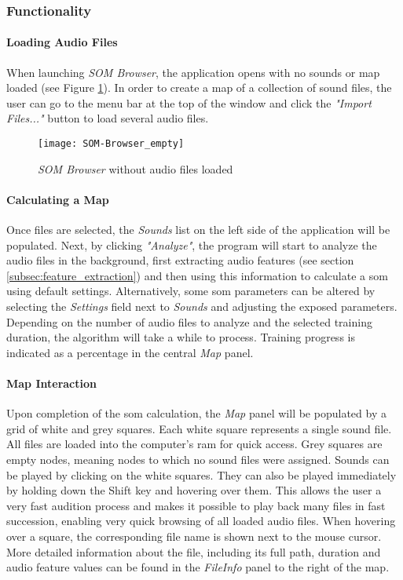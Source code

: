 \subsubsection{Functionality}
\label{subsubsec:som-browser_functionality}
\paragraph*{Loading Audio Files}
When launching \textit{SOM Browser}, the application opens with no sounds or map
loaded (see Figure \ref{fig:som-browser_empty}). In order to create a map of
a collection of sound files, the user can go to the menu bar at the top of the
window and click the \textit{"Import Files..."} button to load several audio
files.

\begin{figure}[!htb]
  \centering
  \texttt{[image: SOM-Browser\_empty]}
  \caption{\textit{SOM Browser} without audio files loaded}
  \label{fig:som-browser_empty}
\end{figure}

\paragraph*{Calculating a Map}
Once files are selected, the \textit{Sounds} list on the left side of the
application will be populated. Next, by clicking \textit{"Analyze"}, the program
will start to analyze the audio files in the background, first extracting
audio features (see section \ref{subsec:feature_extraction}) and then using this
information to calculate a \gls{som} using default settings. Alternatively,
some \gls{som} parameters can be altered by selecting the \textit{Settings}
field next to \textit{Sounds} and adjusting the exposed parameters. Depending on
the number of audio files to analyze and the selected training duration, the
algorithm will take a while to process. Training progress is indicated as a
percentage in the central \textit{Map} panel.

\smallskip

\paragraph*{Map Interaction}
Upon completion of the \gls{som} calculation, the \textit{Map} panel will be
populated by a grid of white and grey squares. Each white square represents a
single sound file. All files are loaded into the computer's \gls{ram} for quick
access. Grey squares are empty nodes, meaning nodes to which no sound
files were assigned. Sounds can be played by clicking on the white squares.
They can also be played immediately by holding down the Shift key and hovering
over them.
This allows the user a very fast audition process and makes it
possible to play back many files in fast succession, enabling very quick
browsing of all loaded audio files. When hovering over a square, the
corresponding file name is shown next to the mouse cursor. More detailed
information about the file, including its full path, duration and audio feature
values can be found in the \textit{FileInfo} panel to the right of the map.

